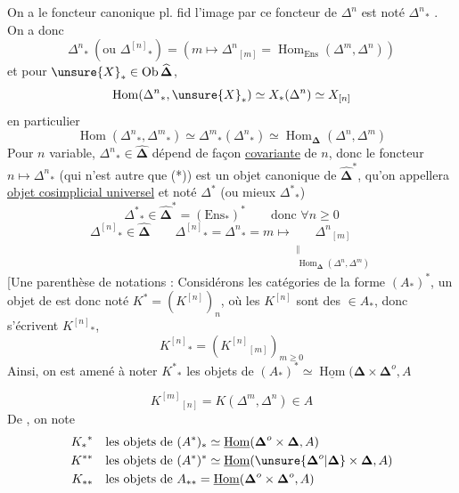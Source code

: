 On a le foncteur canonique pl. fid
l'image par ce foncteur de $\Delta^n$ est noté ${\Delta^n}_*$ . On a donc
\[
{\Delta^n}_*\ (\text{ou }{\Delta^{[n]}}_*)=(m\longmapsto{\Delta^n}_{[m]}=\operatorname{Hom}_{\mathrm{Ens}}(\Delta^m,\Delta^n))
\]
et pour $\unsure{X}_*\in\operatorname{Ob}\widehat{\boldsymbol\Delta}$,
\[
\operatorname{Hom}({\Delta^n}_*,\unsure{X}_*)\simeq X_*(\Delta^n)\simeq X_{[n]}
\]
en particulier
\[
\operatorname{Hom}({\Delta^n}_*,{\Delta^m}_*)\simeq{\Delta^m}_*({\Delta^n}_*)\simeq\operatorname{Hom}_{\boldsymbol\Delta}(\Delta^n,\Delta^m)
\]
Pour $n$ variable, ${\Delta^n}_*\in\widehat{\boldsymbol\Delta}$ dépend de façon \uline{covariante} de $n$,  donc le foncteur $n\longmapsto{\Delta^n}_*$ (qui n'est autre que (*)) est un objet canonique de $\widehat{\boldsymbol\Delta}^*$, qu'on appellera \uline{objet cosimplicial universel} et noté $\Delta^*$ (ou mieux ${\Delta^*}_*${)}
\[
{\Delta^*}_*\in\widehat{\boldsymbol\Delta}^*=(\mathrm{Ens}_*)^*\qquad\text{donc }\forall n\geq0
\]
\[
{\Delta^{[n]}}_*\in\widehat{\boldsymbol\Delta}\qquad
{\Delta^{[n]}}_*={\Delta^n}_*=m\longmapsto
\underset{\substack{\Vert\\\operatorname{Hom}_{\boldsymbol\Delta}(\Delta^n,\Delta^m)}}{{\Delta^n}_{[m]}}
\]
[Une parenthèse de notations : Considérons les catégories de la forme $(A_*)^*$, un objet de  est donc noté $K^*=(K^{[n]})_n$, où les $K^{[n]}$ sont des $\in A_*$, donc s'écrivent ${K^{[n]}}_*$,
\[ {K^{[n]}}_*=({K^{[n]}}_{[m]})_{m\geq0} \]
Ainsi, on est amené à noter ${K^*}_* $ les objets de $(A_*)^*\simeq\underline{\operatorname{Hom}}(\boldsymbol\Delta\times\boldsymbol\Delta^o,A$


\[ {K^{[m]}}_{[n]}=K(\Delta^m,\Delta^n)\in A \]
De , on note
\[
\begin{aligned}
{K_*}^*&\quad\text{les objets de }(A^*)_*\simeq\underline{\operatorname{Hom}}(\boldsymbol\Delta^o\times\boldsymbol\Delta,A)\\
K^{**}&\quad\text{les objets de }(A^*)^*\simeq\underline{\operatorname{Hom}}(\unsure{\boldsymbol\Delta^o|\boldsymbol\Delta}\times\boldsymbol\Delta,A)\\
K_{**}&\quad\text{les objets de }A_{**}=\underline{\operatorname{Hom}}(\boldsymbol\Delta^o\times\boldsymbol\Delta^o,A)
\end{aligned}
\]

